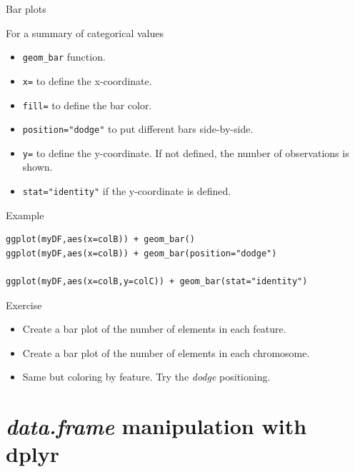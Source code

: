 \documentclass[10pt]{beamer}
\newcommand{\df}{{\it data.frame} }
\begin{document}
\begin{frame}[fragile,shrink=15]{Bar plots}
  \begin{block}{For a summary of categorical values}
    \begin{itemize}
    \item \verb!geom_bar! function.
    \item \verb!x=! to define the x-coordinate.
      \bigskip
    \item \verb!fill=! to define the bar color.
    \item \verb!position="dodge"! to put different bars side-by-side.
      \bigskip
    \item \verb!y=! to define the y-coordinate. If not defined, the number of observations is shown.
    \item \verb!stat="identity"! if the y-coordinate is defined.
    \end{itemize}
  \end{block}
  \begin{exampleblock}{Example}
\begin{verbatim}
ggplot(myDF,aes(x=colB)) + geom_bar()
ggplot(myDF,aes(x=colB)) + geom_bar(position="dodge")

ggplot(myDF,aes(x=colB,y=colC)) + geom_bar(stat="identity")
\end{verbatim}
  \end{exampleblock}
  \begin{alertblock}{Exercise}
    \begin{itemize}
    \item Create a bar plot of the number of elements in each feature.
    \item Create a bar plot of the number of elements in each chromosome.
    \item Same but coloring by feature. Try the {\it dodge} positioning.
    \end{itemize}
  \end{alertblock}
\end{frame}



\section{\df manipulation with {\sf dplyr}}
\end{document}
